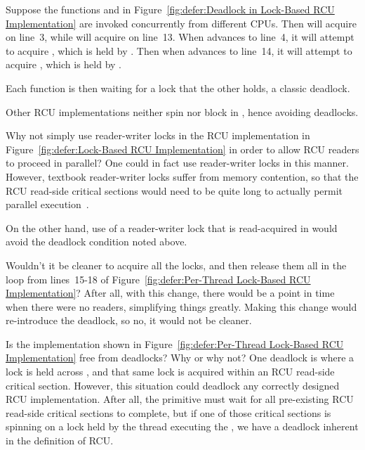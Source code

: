 	Suppose the functions  and  in
	Figure~\ref{fig:defer:Deadlock in Lock-Based RCU Implementation}
	are invoked concurrently from different CPUs.
	Then  will acquire  on line~3,
	while  will acquire  on
	line~13.
	When  advances to line~4, it will attempt to
	acquire , which is held by .
	Then when  advances to line~14, it will attempt
	to acquire , which is held by .

	Each function is then waiting for a lock that the other
	holds, a classic deadlock.

	Other RCU implementations neither spin nor block in
	, hence avoiding deadlocks.

\QuickQ{}
	Why not simply use reader-writer locks in the RCU implementation
	in
	Figure~\ref{fig:defer:Lock-Based RCU Implementation}
	in order to allow RCU readers to proceed in parallel?
\QuickA{}
	One could in fact use reader-writer locks in this manner.
	However, textbook reader-writer locks suffer from memory
	contention, so that the RCU read-side critical sections would
	need to be quite long to actually permit parallel
	execution~\cite{McKenney03a}.

	On the other hand, use of a reader-writer lock that is
	read-acquired in  would avoid the
	deadlock condition noted above.

\QuickQ{}
	Wouldn't it be cleaner to acquire all the locks, and then
	release them all in the loop from lines~15-18 of
	Figure~\ref{fig:defer:Per-Thread Lock-Based RCU Implementation}?
	After all, with this change, there would be a point in time
	when there were no readers, simplifying things greatly.
\QuickA{}
	Making this change would re-introduce the deadlock, so
	no, it would not be cleaner.

\QuickQ{}
	Is the implementation shown in
	Figure~\ref{fig:defer:Per-Thread Lock-Based RCU Implementation}
	free from deadlocks?
	Why or why not?
\QuickA{}
	One deadlock is where a lock is
	held across , and that same lock is
	acquired within an RCU read-side critical section.
	However, this situation could deadlock any correctly designed
	RCU implementation.
	After all, the  primitive must wait for all
	pre-existing RCU read-side critical sections to complete,
	but if one of those critical sections is spinning on a lock
	held by the thread executing the ,
	we have a deadlock inherent in the definition of RCU.

